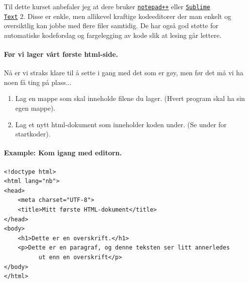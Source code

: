 \documentclass[%
oneside,                 %
final,                   %
12pt]{article}
\newenvironment{notice_mdfboxadmon}[1][]{
\begin{notice_mdfboxmdframed}[frametitle=#1]
}
{
\end{notice_mdfboxmdframed}
}
\begin{document}
Til dette kurset anbefaler jeg at dere bruker
\href{{https://notepad-plus-plus.org}}{\nolinkurl{notepad++}} eller \href{{http://www.sublimetext.com/2}}{\nolinkurl{Sublime
Text}} 2. Disse er enkle, men allikevel
kraftige kodeeditorer der man enkelt og oversiktlig kan jobbe med
flere filer samtidig. De har også god støtte for automatiske
kodeforslag og fargelegging av kode slik at lesing går lettere.

\paragraph{Før vi lager vårt første html-side.}

Nå er vi straks klare til å sette i gang med det som er gøy, men
før det må vi ha noen få ting på plass...


\begin{notice_mdfboxadmon}
\begin{enumerate}
\item Lag en mappe som skal inneholde filene du lager. (Hvert program skal ha sin egen mappe).

\item Lag et nytt html-dokument som inneholder koden under. (Se under for startkoder).
\end{enumerate}

\noindent
\end{notice_mdfboxadmon}



\paragraph{Example: Kom igang med editorn.}
\label{example:komigang}


\begin{notice_mdfboxadmon}
\begin{verbatim}
<!doctype html>
<html lang="nb">
<head>
	<meta charset="UTF-8">
	<title>Mitt første HTML-dokument</title>
</head>
<body>
	<h1>Dette er en overskrift.</h1> 
	<p>Dette er en paragraf, og denne teksten ser litt annerledes 
          ut enn en overskrift</p>
</body>
</html>

\end{verbatim}
\end{notice_mdfboxadmon}
\end{document}
